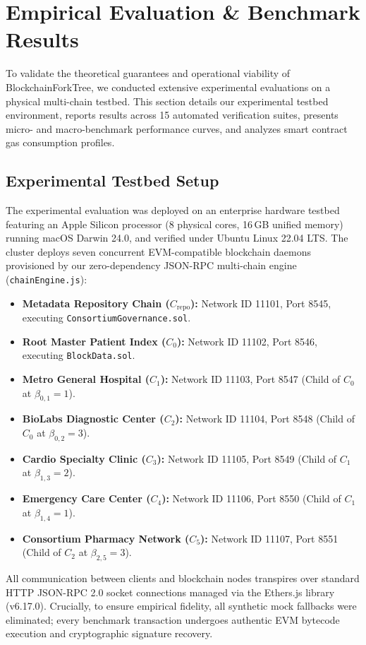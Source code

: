 \section{Empirical Evaluation \& Benchmark Results}
\label{sec:empirical_evaluation}

To validate the theoretical guarantees and operational viability of BlockchainForkTree, we conducted extensive experimental evaluations on a physical multi-chain testbed. This section details our experimental testbed environment, reports results across 15 automated verification suites, presents micro- and macro-benchmark performance curves, and analyzes smart contract gas consumption profiles.

\subsection{Experimental Testbed Setup}
The experimental evaluation was deployed on an enterprise hardware testbed featuring an Apple Silicon processor (8 physical cores, 16\,GB unified memory) running macOS Darwin 24.0, and verified under Ubuntu Linux 22.04 LTS. The cluster deploys seven concurrent EVM-compatible blockchain daemons provisioned by our zero-dependency JSON-RPC multi-chain engine (\texttt{chainEngine.js}):
\begin{itemize}
    \item \textbf{Metadata Repository Chain ($C_{\text{repo}}$):} Network ID 11101, Port 8545, executing \texttt{ConsortiumGovernance.sol}.
    \item \textbf{Root Master Patient Index ($C_0$):} Network ID 11102, Port 8546, executing \texttt{BlockData.sol}.
    \item \textbf{Metro General Hospital ($C_1$):} Network ID 11103, Port 8547 (Child of $C_0$ at $\beta_{0,1} = 1$).
    \item \textbf{BioLabs Diagnostic Center ($C_2$):} Network ID 11104, Port 8548 (Child of $C_0$ at $\beta_{0,2} = 3$).
    \item \textbf{Cardio Specialty Clinic ($C_3$):} Network ID 11105, Port 8549 (Child of $C_1$ at $\beta_{1,3} = 2$).
    \item \textbf{Emergency Care Center ($C_4$):} Network ID 11106, Port 8550 (Child of $C_1$ at $\beta_{1,4} = 1$).
    \item \textbf{Consortium Pharmacy Network ($C_5$):} Network ID 11107, Port 8551 (Child of $C_2$ at $\beta_{2,5} = 3$).
\end{itemize}
All communication between clients and blockchain nodes transpires over standard HTTP JSON-RPC 2.0 socket connections managed via the Ethers.js library (v6.17.0). Crucially, to ensure empirical fidelity, all synthetic mock fallbacks were eliminated; every benchmark transaction undergoes authentic EVM bytecode execution and cryptographic signature recovery.

